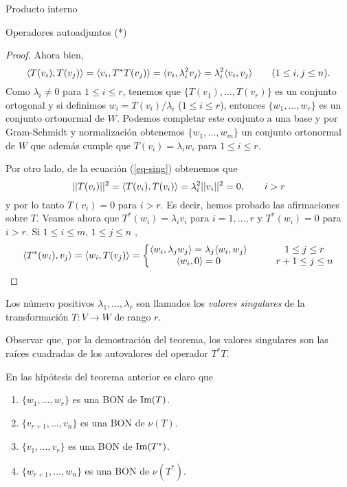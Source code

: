 \begin{chapter}{Producto interno}
\begin{section}{Operadores autoadjuntos (*)}
\begin{proof}
            Ahora bien,
            \begin{equation}\label{eq-sing}
                \langle T(v_i),T(v_j) \rangle = \langle v_i,T^*T(v_j) \rangle = \langle v_i, \lambda_i^2 v_j \rangle  = \lambda_i^2\langle v_i,  v_j \rangle\qquad (1\le i,j \le n).
            \end{equation}
            Como $\lambda_i \ne 0$ para $1 \le i \le r$, tenemos que $\{T(v_1),\ldots,T(v_r)\}$ es un conjunto ortogonal y si definimos $w_i = T(v_i)/\lambda_i$ ($1 \le i \le r$), entonces $\{w_1,\ldots,w_r\}$ es un conjunto ortonormal de $W$. Podemos completar este conjunto a una base y por  Gram-Schmidt y  normalización obtenemos $\{w_1,\ldots,w_m\}$ un conjunto ortonormal de $W$ que además cumple  que $T(v_i) = \lambda_i w_i$ para   $1 \le i \le r$.
            
            Por otro lado,  de la ecuación (\ref{eq-sing}) obtenemos que 
            $$
            ||T(v_i)||^2 = \langle T(v_i),T(v_i) \rangle = \lambda_i^2||v_i||^2 = 0, \qquad i>r
            $$     
            y por lo tanto $T(v_i)=0$ para $i>r$.  Es decir, hemos probado las afirmaciones sobre $T$. Veamos ahora que $T^*(w_i) = \lambda_i v_i$ para $i=1,\ldots,r$ y $T^*(w_i) = 0$ para $i > r$. Si $ 1 \le i \le m$, $ 1 \le j \le n$ ,
            $$
            \langle T^*(w_i),v_j \rangle = \langle w_i,T(v_j) \rangle = \left\{
            \begin{matrix}
            \langle w_i,\lambda_j w_j \rangle = \lambda_j\langle w_i,w_j \rangle&\quad&1 \le j \le r \\
            \langle w_i,0 \rangle = 0&\quad&r+1 \le j \le n 
            \end{matrix}
            \right.
            $$
        \end{proof}
        
        Los número positivos $\lambda_1,\ldots,\lambda_r$ son llamados los \textit{valores singulares} de la transformación $T: V \to W$ de rango $r$. 
        
        \begin{obs*}
            Observar que, por la demostración del teorema, los valores singulares son las raíces cuadradas de los autovalores del operador $T^*T$. 
        \end{obs*}
        
        
        \begin{obs*}
            En las hipótesis del teorema anterior es claro que
            \begin{enumerate}
                \item $\{w_1,\ldots,w_r \}$ es una BON de  $\operatorname{Im}(T)$.
                \item $\{v_{r+1},\ldots,v_n \}$ es una BON de  $\nu(T)$.
                \item $\{v_1,\ldots,v_r \}$ es una BON de  $\operatorname{Im}(T^*)$.
                \item $\{w_{r+1},\ldots,w_n \}$ es una BON de  $\nu(T^*)$.
            \end{enumerate}
        \end{obs*}
        

\end{section}
\end{chapter}
